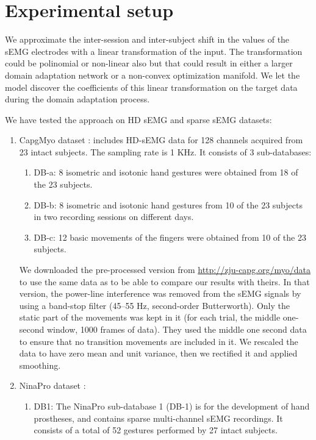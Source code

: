 \documentclass[conference]{IEEEtran}
\begin{document}
\section{Experimental setup} \label{sec:experimental_setup}

We approximate the inter-session and inter-subject shift in the values of the sEMG electrodes with a linear transformation of the input.
The transformation could be polinomial or non-linear also but that could result in either a larger domain adaptation network or a non-convex optimization manifold.
We let the model discover the coefficients of this linear transformation on the target data during the domain adaptation process.

We have tested the approach on HD sEMG and sparse sEMG datasets:
\begin{enumerate}
  \item CapgMyo dataset \cite{b18}: includes HD-sEMG data for 128 channels acquired from 23 intact subjects. The sampling rate is 1 KHz. It consists of 3 sub-databases:
  \begin{enumerate}
	\item DB-a: 8 isometric and isotonic hand gestures were obtained from 18 of the 23 subjects.
	\item DB-b: 8 isometric and isotonic hand gestures from 10 of the 23 subjects in two recording sessions on different days.
	\item DB-c: 12 basic movements of the fingers were obtained from 10 of the 23 subjects.
  \end{enumerate}
  We downloaded the pre-processed version from \url{http://zju-capg.org/myo/data} to use the same data as \cite{b18} to be able to compare our results with theirs.
  In that version, the power-line interference was removed from the sEMG signals by using a band-stop filter (45–55 Hz, second-order Butterworth).
  Only the static part of the movements was kept in it (for each trial, the middle one-second window, 1000 frames of data).
  They used the middle one second data to ensure that no transition movements are included in it.
  We rescaled the data to have zero mean and unit variance, then we rectified it and applied smoothing.
  \item NinaPro dataset \cite{b23}:
	  \begin{enumerate}
		\item DB1: The NinaPro sub-database 1 (DB-1) is for the development of hand prostheses, and contains sparse multi-channel sEMG recordings.
		It consists of a total of 52 gestures performed by 27 intact subjects.

\end{enumerate}
\end{enumerate}
\end{document}
